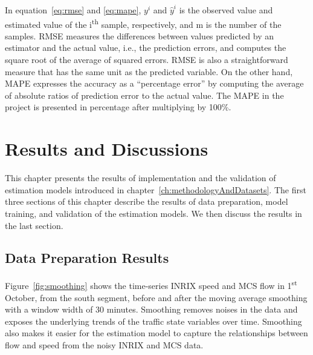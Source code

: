 \documentclass[english]{kththesis}
\begin{document}
In equation~\ref{eq:rmse} and \ref{eq:mape}, $y^i$ and $\hat{y}^i$ is the observed value and estimated value of the i\textsuperscript{th} sample, respectively, and m is the number of the samples. RMSE measures the differences between values predicted by an estimator and the actual value, i.e., the prediction errors, and computes the square root of the average of squared errors. RMSE is also a straightforward measure that has the same unit as the predicted variable. On the other hand, MAPE expresses the accuracy as a “percentage error” by computing the average of absolute ratios of prediction error to the actual value. The MAPE in the project is presented in percentage after multiplying by 100\%.

\chapter{Results and Discussions }
\label{ch:resultsAndDiscussions}
This chapter presents the results of implementation and the validation of estimation models introduced in chapter~\ref{ch:methodologyAndDatasets}. The first three sections of this chapter describe the results of data preparation, model training, and validation of the estimation models. We then discuss the results in the last section.

\section{Data Preparation Results}
\label{sec:resultsDataPreparation}
Figure~\ref{fig:smoothing} shows the time-series INRIX speed and MCS flow in 1\textsuperscript{st} October, from the south segment, before and after the moving average smoothing with a window width of 30 minutes. Smoothing removes noises in the data and exposes the underlying trends of the traffic state variables over time. Smoothing also makes it easier for the estimation model to capture the relationships between flow and speed from the noisy INRIX and MCS data.
\end{document}

